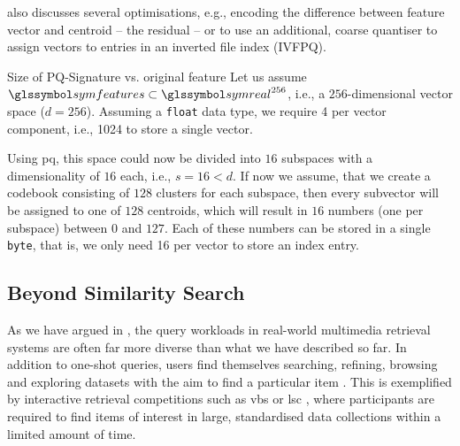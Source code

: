 \cite{Jegou:2010Product} also discusses several optimisations, e.g., encoding the difference between feature vector and centroid -- the residual -- or to use an additional, coarse quantiser to assign vectors to entries in an inverted file index (IVFPQ).

\begin{example}[label=example:pq_compression]{Size of PQ-Signature vs. original feature}{}
    Let us assume $\symfeatures \subset \symreal^{256}$, i.e., a $256$-dimensional vector space ($d = 256$). Assuming a \texttt{float} data type, we require \SI{4}{\byte} per vector component, i.e., \SI{1024}{\byte} to store a single vector.
    
    Using \acrshort{pq}, this space could now be divided into $16$ subspaces with a dimensionality of $16$ each, i.e., $s = 16 < d$. If now we assume, that we create a codebook consisting of $128$ clusters for each subspace, then every subvector will be assigned to one of $128$ centroids, which will result in $16$ numbers (one per subspace) between $0$ and $127$. Each of these numbers can be stored in a single \texttt{byte}, that is, we only need \SI{16}{\byte} per vector to store an index entry.
\end{example}

\subsection{Beyond Similarity Search}
As we have argued in , the query workloads in real-world multimedia retrieval systems are often far more diverse than what we have described so far. In addition to one-shot queries, users find themselves searching, refining, browsing and exploring datasets with the aim to find a particular item \cite{Lokovc:2019Interactive,Rossetto:2020Interactive}. This is exemplified by interactive retrieval competitions such as \acrshort{vbs} \cite{Schoeffmann:2019Video,Lokovc:2018Influential} or \acrshort{lsc} \cite{Gurrin:2021Introduction}, where participants are required to find items of interest in large, standardised data collections \cite{Berns:2019V3C1,Rossetto:2021Insights} within a limited amount of time.

